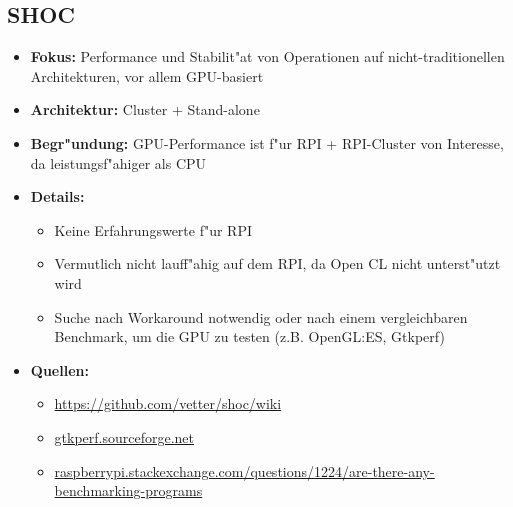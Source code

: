 \documentclass{scrartcl}
\begin{document}
\subsection{SHOC}
\begin{itemize}
	\item \textbf{Fokus:} Performance und Stabilit"at von Operationen auf nicht-traditionellen Architekturen, vor allem GPU-basiert 
	\item \textbf{Architektur:} Cluster + Stand-alone
	\item \textbf{Begr"undung:} GPU-Performance ist f"ur RPI + RPI-Cluster von Interesse, da leistungsf"ahiger als CPU  	
	\item \textbf{Details:} 
	\begin{itemize}
		\item Keine Erfahrungswerte f"ur RPI 
		\item Vermutlich nicht lauff"ahig auf dem RPI, da Open CL nicht unterst"utzt wird
		\item Suche nach Workaround notwendig oder nach einem vergleichbaren Benchmark, um die GPU zu testen (z.B. OpenGL:ES, Gtkperf)
	\end{itemize}				
	\item \textbf{Quellen:}
	\begin{itemize}
		\item \uline{https://github.com/vetter/shoc/wiki}	
		\item \uline{gtkperf.sourceforge.net}
		\item \uline{raspberrypi.stackexchange.com/questions/1224/are-there-any-benchmarking-programs}
	\end{itemize}
\end{itemize}	 
\end{document}
